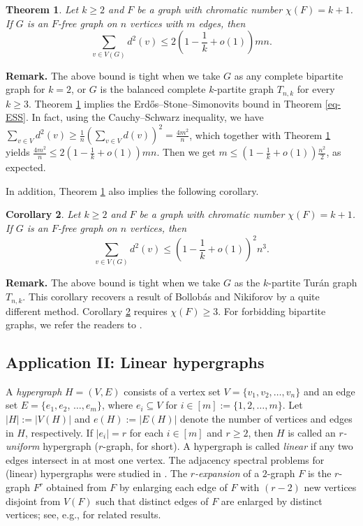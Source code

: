 \documentclass[11pt,a4paper]{article}
\theoremstyle{plain}
\newtheorem{theorem}{Theorem}[section]
\newtheorem{coro}[theorem]{Corollary}
\theoremstyle{definition}
\begin{document}
\begin{theorem} \label{thm-2-14}
Let $k\ge 2$ and $F$ be a graph with chromatic number $\chi(F)= k+1$.
If $G$ is an $F$-free graph on
$n$ vertices with $m$ edges, then
\[ \sum_{v\in V(G)} d^2(v) \le 2\left( 1-\frac{1}{k} + o(1)\right)mn. \]  
\end{theorem}
 


\noindent
{\bf Remark.} 
The above bound is tight when we take $G$ as any  complete bipartite graph for $k=2$, or $G$ is the 
balanced complete $k$-partite graph $T_{n,k}$ for every $k\ge 3$. 
 Theorem \ref{thm-2-14} implies the Erd\H{o}s--Stone--Simonovits bound in Theorem \ref{eq-ESS}. 
In fact, using the Cauchy--Schwarz inequality, we have
$\sum_{v\in V} d^2(v) \ge \frac{1}{n} 
\left(\sum_{v\in V} d(v) \right)^2 = \frac{4m^2}{n}$, which together with 
Theorem \ref{thm-2-14} yields $\frac{4m^2}{n} \le 2\left(1- \frac{1}{k} + o(1) \right)mn$. Then we get  
$m\le \left(1- \frac{1}{k} + o(1) \right) \frac{n^2}{2}$, as expected. 

\medskip 
In addition, Theorem \ref{thm-2-14} also implies the following corollary.

\begin{coro} \label{coro-1-7}
Let $k\ge 2$ and $F$ be a graph with chromatic number $\chi(F) =k+1$.
If $G$ is an $F$-free graph on
$n$ vertices, then
\[ \sum_{v\in V(G)} d^2(v) \le \left( 1-\frac{1}{k} + o(1)\right)^2 n^3. \] 
\end{coro}



\noindent
{\bf Remark.} 
The above bound is tight when we take $G$ as the $k$-partite Tur\'{a}n graph $T_{n,k}$. 
This corollary recovers a result of Bollob\'{a}s and Nikiforov \cite{BN2012} by a quite different method. 
 Corollary \ref{coro-1-7} requires $\chi (F)\ge 3$. 
For forbidding bipartite graphs, we refer the readers to 
\cite{BL2024,G2025,LLQ2019,Niki2009-degree}. 



\subsection{Application II: Linear hypergraphs}
A {\it hypergraph} $H=(V,E)$ consists of a vertex set $V=\{v_1,v_2,\ldots,v_n\}$  and an edge set $E=\{e_1,e_2$, $\ldots,e_m\}$, where $e_i \subseteq V$ for $i \in [m]:=\{1,2,\ldots,m\}$.
 Let $|H|:=|V(H)|$ and $e(H):= |E(H)|$ denote  the number of vertices and edges in $H$, respectively. If $|e_i|=r$ for each $i \in [m]$ and $r \geq2$, then $H$ is called an  {\it $r$-uniform} hypergraph ({$r$}-graph, for short). A hypergraph is called {\it linear} if any two edges intersect in at most one vertex.   
 The adjacency spectral problems for (linear) hypergraphs were studied in \cite{GC2021,GCH2022,HCC2021,KLM2014}.  
  The  {\it $r$-expansion}  of a $2$-graph $F$ is the $r$-graph $F^{r}$ obtained from $F$ by enlarging each edge of $F$ with $(r-2)$ new vertices disjoint from $V(F)$ such that distinct edges of $F$ are enlarged by distinct vertices; 
 see, e.g., \cite{Ger2025,SFKH2022,SFK2025} for related results.   
 
\end{document}
